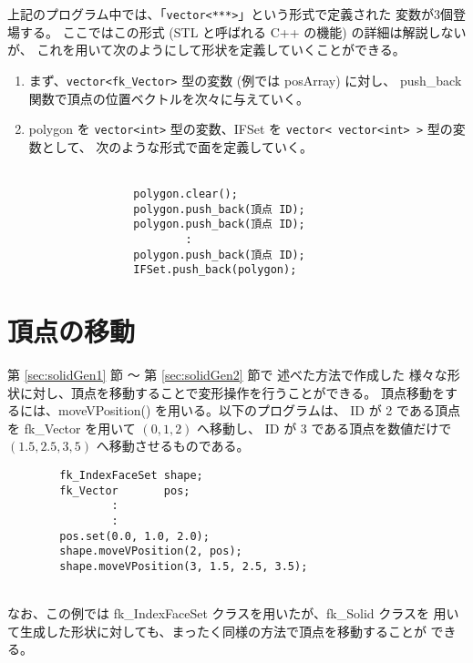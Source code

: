 上記のプログラム中では、「\verb+vector<***>+」という形式で定義された
変数が3個登場する。
ここではこの形式 (STL と呼ばれる C++ の機能) の詳細は解説しないが、
これを用いて次のようにして形状を定義していくことができる。
\begin{enumerate}
 \item まず、\verb+vector<fk_Vector>+ 型の変数 (例では posArray) に対し、
	push\_back 関数で頂点の位置ベクトルを次々に与えていく。

 \item polygon を \verb+vector<int>+ 型の変数、IFSet を
	\verb+vector< vector<int> >+ 型の変数として、
	次のような形式で面を定義していく。\\ ~ \\
	\begin{screen}
	\begin{verbatim}
                polygon.clear();
                polygon.push_back(頂点 ID);
                polygon.push_back(頂点 ID);
                        :
                polygon.push_back(頂点 ID);
                IFSet.push_back(polygon);
	\end{verbatim}
	\end{screen}
\end{enumerate}

\section{頂点の移動} \label{sec:movevertex}
第 \ref{sec:solidGen1} 節 〜 第 \ref{sec:solidGen2} 節で
述べた方法で作成した
様々な形状に対し、頂点を移動することで変形操作を行うことができる。
頂点移動をするには、moveVPosition() を用いる。以下のプログラムは、
ID が 2 である頂点を fk\_Vector を用いて \((0, 1, 2)\) へ移動し、
ID が 3 である頂点を数値だけで \((1.5, 2.5, 3,5)\) へ移動させるものである。
\\
\begin{breakbox}
\begin{verbatim}
        fk_IndexFaceSet shape;
        fk_Vector       pos;
                :
                :
        pos.set(0.0, 1.0, 2.0);
        shape.moveVPosition(2, pos);
        shape.moveVPosition(3, 1.5, 2.5, 3.5);
\end{verbatim}
\end{breakbox}
~ \\
なお、この例では fk\_IndexFaceSet クラスを用いたが、fk\_Solid クラスを
用いて生成した形状に対しても、まったく同様の方法で頂点を移動することが
できる。

